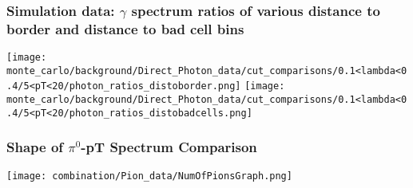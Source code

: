 \documentclass{beamer}
\begin{document}
\frame
{
	\frametitle{Simulation data: $\gamma$ spectrum ratios of various distance to border and distance to bad cell bins}
	\texttt{[image: monte\_carlo/background/Direct\_Photon\_data/cut\_comparisons/0.1<lambda<0.4/5<pT<20/photon\_ratios\_distoborder.png]}
	\texttt{[image: monte\_carlo/background/Direct\_Photon\_data/cut\_comparisons/0.1<lambda<0.4/5<pT<20/photon\_ratios\_distobadcells.png]}
}

\frame
{
	\frametitle{Shape of $\pi^0$-pT Spectrum Comparison}
	\texttt{[image: combination/Pion\_data/NumOfPionsGraph.png]}	
}
\end{document}
